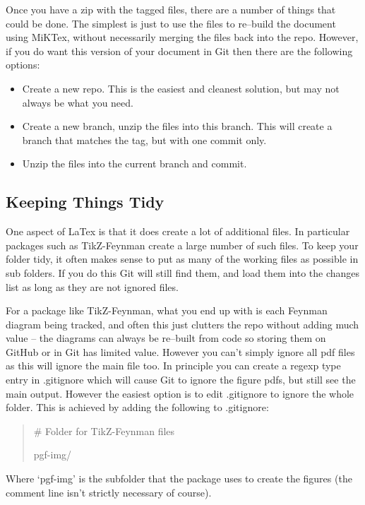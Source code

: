 \documentclass[a4paper, 12pt]{article}
\begin{document}
Once you have a zip with the tagged files, there are a number of things that could be done. The simplest is just to use the files to re--build the document using MiKTex, without necessarily merging the files back into the repo. However, if you do want this version of your document in Git then there are the following options:
\begin{itemize}
\item Create a new repo. This is the easiest and cleanest solution, but may not always be what you need.
\item Create a new branch, unzip the files into this branch. This will create a branch that matches the tag, but with one commit only.
\item Unzip the files into the current branch and commit.
\end{itemize}


\subsection{Keeping Things Tidy}
One aspect of LaTex is that it does create a lot of additional files. In particular packages such as TikZ-Feynman create a large number of such files. To keep your folder tidy, it often makes sense to put as many of the working files as possible in sub folders. If you do this Git will still find them, and load them into the changes list as long as they are not ignored files.

For a package like TikZ-Feynman, what you end up with is each Feynman diagram being tracked, and often this just clutters the repo without adding much value -- the diagrams can always be re--built from code so storing them on GitHub or in Git has limited value. However you can't simply ignore all pdf files as this will ignore the main file too. In principle you can create a regexp type entry in .gitignore which will cause Git to ignore the figure pdfs, but still see the main output. However the easiest option is to edit .gitignore to ignore the whole folder. This is achieved by adding the following to .gitignore:
\begin{quote}
\# Folder for TikZ-Feynman files

pgf-img/
\end{quote}
Where `pgf-img' is the subfolder that the package uses to create the figures (the comment line isn't strictly necessary of course).
\end{document}
